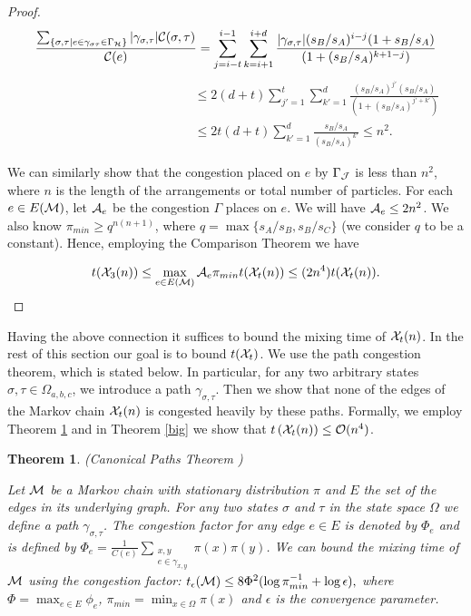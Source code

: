 \documentclass[10 pt]{article}
\newcommand{\EX}{{\cal X}}
\newcommand{\J}{{\cal J}}
\newcommand{\Ho}{{\cal H}}
\newtheorem{thm}{Theorem}[section]
\begin{document}
\begin{proof}
$$
  \frac{\sum_{\{\sigma,\tau\vert e \in \gamma_{\sigma\tau}\in \Gamma_{\Ho}\}}
 \vert\gamma_{\sigma,\tau}\vert  {\cal C}(\sigma,\tau)}{{\cal C}(e)}=\sum_{j=i-t}^{i-1}\sum_{k=i+1}^{i+d} \frac{\vert\gamma_{\sigma,\tau}\vert (s_B/s_A)^{i-j} (1+s_B/s_A) }{(1+ (s_B/s_A)^{k+1-j})}
$$
$$ 
\begin{array}{ll}
\hspace{5cm}& \leq 2(d{+}t) \sum_{j'=1}^{t} \sum_{k'=1}^{d}\frac{(s_B/s_A)^{j'} (s_B/s_A) }{(1+(s_B/s_A)^{j'+k'})}\\
&\leq 2t(d{+}t) \sum_{k'=1}^{d} \frac{{s_B}/{s_A}}{({s_B}/{s_A})^{k'}}\leq n^2.
\end{array}
$$


We can similarly show that the congestion placed on $e$ by $\Gamma_{\J}$ is less than $n^2$, where $n $ is the length of the
arrangements or total number of particles. For each $e\in E({\cal M})$, let ${\cal A}_e$ be the congestion $\Gamma$ places on $e$.
We will have ${\cal A}_e\leq 2n^2$.  We also know $\pi_{min}\geq q^{n(n+1)}$, where $q=\max\{s_A/s_B,s_B/s_C\}$ (we consider $q$
to be a constant). Hence, employing the Comparison Theorem we have

$$
t(\EX_3(n)) \leq   \max_{e\in E({\cal M})}{\cal A}_e \pi_{min} t(\EX_t(n))
\leq (2n^4 ) t(\EX_t(n)).
$$
\end{proof}

Having the above connection it suffices to bound the mixing time of $\EX_t(n)$. In the rest of this section our goal is to bound
$t(\EX_t)$. We use the path congestion theorem, which is stated below.  In particular,
for any two arbitrary states $\sigma,\tau \in \Omega_{a,b,c}$,  we introduce a path $\gamma_{\sigma,\tau}$.
Then we show that none of the edges of the Markov chain $\EX_t(n)$ is congested heavily by these paths.
Formally, we employ Theorem \ref{canonicalPaths} and in Theorem \ref{big} we show that $t\left(\EX_t(n)\right) \leq{\cal O}(n^4)$.

\newpage
\begin{thm}(Canonical Paths Theorem \cite{Permanent})\label{canonicalPaths}

Let $\cal M$ be a Markov chain with stationary distribution $\pi$ and $E$  the set of the edges in its underlying graph. 
For any two states $\sigma$ and $\tau$ in the state space $\Omega$ we define a path $\gamma_{\sigma,\tau}$.
The congestion factor for any edge $e\in E$ is denoted by $\Phi_e$ and is defined by
 $
\Phi_e=\frac{1}{C(e)} \sum_{\substack{x,y\\ e\in \gamma_{x,y}} }\pi(x) \pi(y)
$. We can bound the mixing time of $\cal M$ using the congestion factor:
$
t_{\epsilon}({\cal M})\leq 8 \Phi^2 (\log \pi_{min}^{-1} + \log \epsilon ),
$
where $\Phi=\max_{e\in E} \phi_{e}$, $\pi_{min}=\min_{x\in \Omega}\pi(x)$ and $\epsilon$ is the convergence parameter. 
\end{thm}
\end{document}
